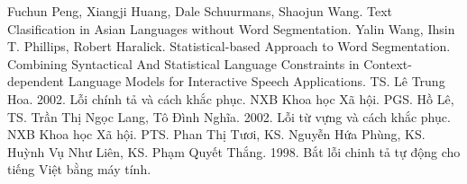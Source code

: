 \documentclass[a4paper,oneside]{book} %
\begin{document}
\begin{thebibliography}{}
\bibitem{}Fuchun Peng, Xiangji Huang, Dale Schuurmans, Shaojun
  Wang. Text Clasification in Asian Languages without Word
  Segmentation. 
\bibitem{}Yalin Wang, Ihsin T. Phillips, Robert
  Haralick. Statistical-based Approach to Word Segmentation.
\bibitem{}Combining Syntactical And Statistical Language Constraints
  in Context-dependent Language Models for Interactive Speech Applications.
\bibitem{}TS. Lê Trung Hoa. 2002. Lỗi chính tả và cách khắc phục. NXB Khoa
  học Xã hội. 
\bibitem{}PGS. Hồ Lê, TS. Trần Thị Ngọc Lang, Tô Đình Nghĩa. 2002. Lỗi từ
  vựng và cách khắc phục. NXB Khoa học Xã hội.
PTS. Phan Thị Tươi, KS. Nguyễn Hứa Phùng, KS. Huỳnh Vụ
  Như Liên, KS. Phạm Quyết Thắng. 1998. Bắt lỗi chinh tả tự động cho
  tiếng Việt bằng máy tính.
\end{thebibliography}
\end{document}
